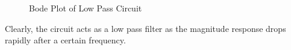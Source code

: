\documentclass{article}
\begin{document}
\begin{figure}%
    \centering
    \qquad
    \caption{Bode Plot of Low Pass Circuit}%
    \label{fig:example}%
\end{figure}

Clearly, the circuit acts as a low pass filter as the magnitude response drops rapidly after a certain frequency.
\end{document}
